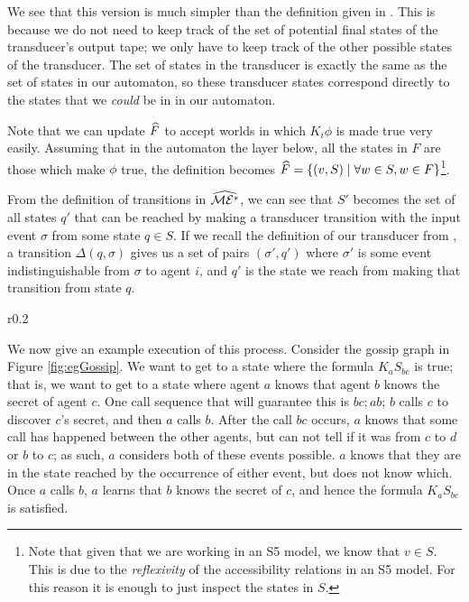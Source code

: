 \documentclass[ %
                    author={Leo Poulson},
                supervisor={Dr. Steven Ramsay},
                    degree={BSc},
                     title={Epistemic Planning for the Dynamic Gossip problem},
                  subtitle={},
                      year={2019} ]{dissertation}
\begin{document}
We see that this version is much simpler than the definition given in
. This is because we do not need to keep track of the
set of potential final states of the transducer's output tape; we only have to
keep track of the other possible states of the transducer. The set of states in
the transducer is exactly the same as the set of states in our \mestar automaton,
so these transducer states correspond directly to the states that we
\emph{could} be in in our \mestar automaton.

Note that we can update $\widehat{F}$ to accept worlds in which $K_i \phi$ is made
true very easily. Assuming that in the automaton the layer below, all the states
in $F$ are those which make $\phi$ true, the definition becomes $\widehat{F} =
\left\{ (v, S) \mid \forall w \in S, w \in F \right\}$\footnote{Note that given
  that we are working in an \textsf{S5} model, we know that $v \in S$. This is
  due to the \emph{reflexivity} of the accessibility relations in an \textsf{S5}
model. For this reason it is enough to just inspect the states in $S$.}.

From the definition of transitions in $\widehat{\mathcal{ME^\ast}}$, we can see that $S'$
becomes the set of all states $q'$ that can be reached by making a transducer
transition with the input event $\sigma$ from some state $q \in S$. If we recall
the definition of our transducer from , a
transition $\Delta(q, \sigma)$ gives us a set of pairs $(\sigma', q')$ where
$\sigma'$ is some event indistinguishable from $\sigma$ to agent $i$, and $q'$
is the state we reach from making that transition from state $q$.

\begin{wrapfigure}{r}{0.2\textwidth}
  \centering
  \caption{}
  \label{fig:egGossip}
\end{wrapfigure}

We now give an example execution of this process. Consider the gossip graph in
Figure \ref{fig:egGossip}. We want to get to a state where the formula $K_a
S_{bc}$ is true; that is, we want to get to a state where agent $a$ knows that
agent $b$ knows the secret of agent $c$. One call sequence that will guarantee
this is $bc; ab$; $b$ calls $c$ to discover $c$'s secret, and then $a$ calls
$b$. After the call $bc$ occurs, $a$ knows that some call has happened between
the other agents, but can not tell if it was from $c$ to $d$ or $b$ to $c$; as
such, $a$ considers both of these events possible. $a$ knows that they are in
the state reached by the occurrence of either event, but does not know which.
Once $a$ calls $b$, $a$ learns that $b$ knows the secret of $c$, and hence the
formula $K_a S_{bc}$ is satisfied. 
\end{document}
